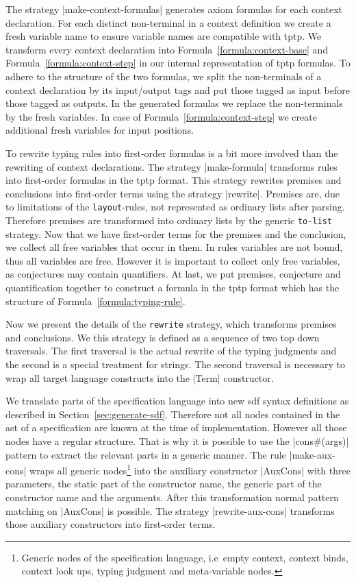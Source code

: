 The strategy \code|make-context-formulas| generates axiom formulas for
each context declaration. For each distinct non-terminal in a context
definition we create a fresh variable name to ensure variable names
are compatible with \gls{tptp}. We transform every context declaration
into Formula~\ref{formula:context-base} and
Formula~\ref{formula:context-step} in our internal representation of
\gls{tptp} formulas. To adhere to the structure of the two formulas,
we split the non-terminals of a context declaration by its
input/output tags and put those tagged as input before those tagged as
outputs. In the generated formulas we replace the non-terminals by the
fresh variables. In case of Formula~\ref{formula:context-step} we
create additional fresh variables for input positions.

To rewrite typing rules into first-order formulas is a bit more
involved than the rewriting of context declarations. The strategy
\code|make-formula| transforms rules into first-order formulas in the
\gls{tptp} format. This strategy rewrites premises and conclusions
into first-order terms using the strategy \code|rewrite|. Premises
are, due to limitations of the \texttt{layout}-rules, not represented
as ordinary lists after parsing. Therefore premises are transformed
into ordinary lists by the generic \texttt{to-list} strategy. Now that
we have first-order terms for the premises and the conclusion, we
collect all free variables that occur in them. In rules variables are
not bound, thus all variables are free. However it is important to
collect only free variables, as conjectures may contain
quantifiers. At last, we put premises, conjecture and quantification
together to construct a formula in the \gls{tptp} format which has the
structure of Formula~\ref{formula:typing-rule}.

Now we present the details of the \texttt{rewrite} strategy, which
transforms premises and conclusions. We this strategy is defined as a
sequence of two top down traversals. The first traversal is the actual
rewrite of the typing judgments and the second is a special treatment
for strings. The second traversal is necessary to wrap all target
language constructs into the \code|Term| constructor.

We translate parts of the specification language into new \gls{sdf}
syntax definitions as described in
Section~\ref{sec:generate-sdf}. Therefore not all nodes contained in
the \gls{ast} of a specification are known at the time of
implementation. However all those nodes have a regular structure. That
is why it is possible to use the \code|cons#(args)| pattern to extract
the relevant parts in a generic manner. The rule \code|make-aux-cons|
wraps all generic nodes\footnote{Generic nodes of the specification
  language, i.e\ empty context, context binds, context look ups,
  typing judgment and meta-variable nodes.} into the auxiliary
constructor \code|AuxCons| with three parameters, the static part of
the constructor name, the generic part of the constructor name and the
arguments. After this transformation normal pattern matching on
\code|AuxCons| is possible. The strategy \code|rewrite-aux-cons|
transforms those auxiliary constructors into first-order terms.

